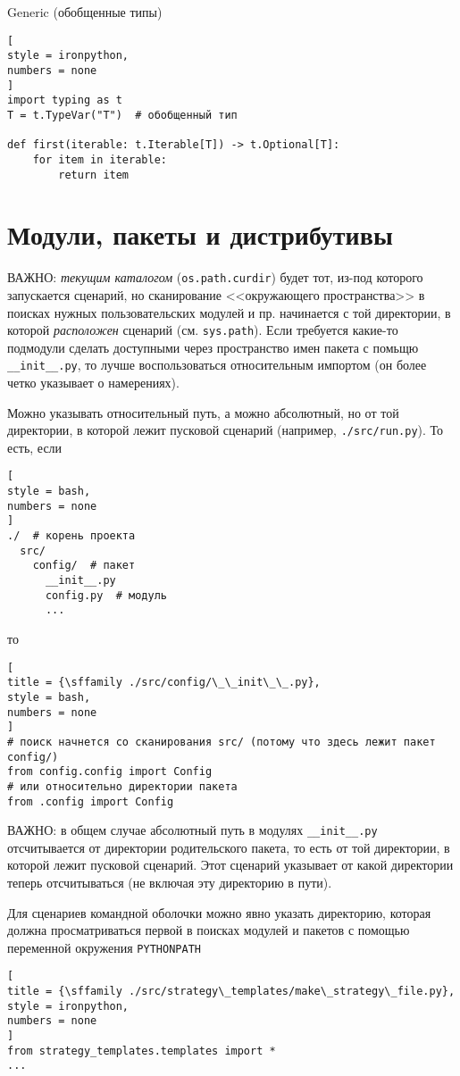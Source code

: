 \documentclass[%
	11pt,
	a4paper,
	utf8,
		]{article}
\begin{document}
Generic (обобщенные типы)
\begin{lstlisting}[
style = ironpython,
numbers = none
]
import typing as t
T = t.TypeVar("T")  # обобщенный тип

def first(iterable: t.Iterable[T]) -> t.Optional[T]:
    for item in iterable:
        return item
\end{lstlisting}


\section{Модули, пакеты и дистрибутивы}

ВАЖНО: \emph{текущим каталогом} (\verb|os.path.curdir|) будет тот, из-под которого запускается сценарий, но сканирование <<окружающего пространства>> в поисках нужных пользовательских модулей и пр. начинается с той директории, в которой \emph{расположен} сценарий (см. \verb|sys.path|). Если требуется какие-то подмодули сделать доступными через пространство имен пакета с помьщю \verb|__init__.py|, то лучше воспользоваться относительным импортом (он более четко указывает о намерениях).

Можно указывать относительный путь, а можно абсолютный, но от той {директории}, в которой лежит пусковой сценарий (например, \verb|./src/run.py|). То есть, если
\begin{lstlisting}[
style = bash,
numbers = none
]
./  # корень проекта
  src/
    config/  # пакет
      __init__.py
      config.py  # модуль
      ...
\end{lstlisting}
то
\begin{lstlisting}[
title = {\sffamily ./src/config/\_\_init\_\_.py},
style = bash,
numbers = none
]
# поиск начнется со сканирования src/ (потому что здесь лежит пакет config/)
from config.config import Config
# или относительно директории пакета
from .config import Config
\end{lstlisting}

ВАЖНО: в общем случае абсолютный путь в модулях \verb|__init__.py| отсчитывается от директории родительского пакета, то есть от той директории, в которой лежит пусковой сценарий. Этот сценарий указывает от какой директории теперь отсчитываться (не включая эту директорию в пути).

Для сценариев командной оболочки можно явно указать директорию, которая должна просматриваться первой в поисках модулей и пакетов с помощью переменной окружения \verb*|PYTHONPATH|
\begin{lstlisting}[
title = {\sffamily ./src/strategy\_templates/make\_strategy\_file.py},
style = ironpython,
numbers = none
]
from strategy_templates.templates import *
...
\end{lstlisting}
\end{document}
